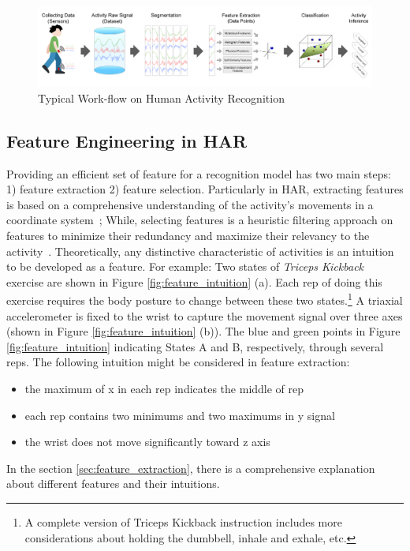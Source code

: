 \documentclass[journal,article,submit,moreauthors,pdftex]{Definitions/mdpi}
\begin{document}
\begin{figure}[H]
	\centering
	\includegraphics[width=15.5 cm]{Definitions/images/main_approach.jpg}
	\caption{Typical Work-flow on Human Activity Recognition}
	\label{fig:main_approach}
\end{figure} 

\subsection{Feature Engineering in HAR}

Providing an efficient set of feature for a recognition model has two main steps: 1) feature extraction 2) feature selection. Particularly in HAR, extracting features is based on a comprehensive understanding of the activity's movements in a coordinate system~\cite{}; While, selecting features is a heuristic filtering approach on features to minimize their redundancy and maximize their relevancy to the activity~\cite{}. Theoretically, any distinctive characteristic of  activities is an intuition to be developed as a feature. For example: Two states of \textit{Triceps Kickback} exercise are shown in Figure \ref{fig:feature_intuition} (a). Each rep of doing this exercise requires the body posture to change between these two states.\footnote{A complete version of Triceps Kickback instruction includes more considerations about holding the dumbbell, inhale and exhale, etc.} A triaxial accelerometer is fixed to the wrist to capture the movement signal over three axes (shown in Figure \ref{fig:feature_intuition} (b)). The blue and green points in Figure \ref{fig:feature_intuition} indicating States A and B, respectively, through several reps. The following intuition might be considered in feature extraction:
\begin{itemize}
	\item the maximum of x in each rep indicates the middle of rep
	\item each rep contains two minimums and two maximums in y signal
	\item the wrist does not move significantly toward z axis
\end{itemize}
In the section \ref{sec:feature_extraction}, there is a comprehensive explanation about different features and their intuitions.
\end{document}
